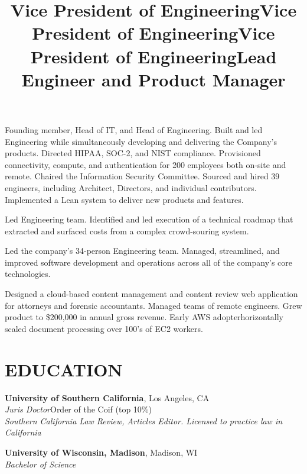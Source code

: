 \documentclass[margin]{res}
\begin{document}
\begin{resume}
\title{\textbf{Vice President of Engineering}}
\begin{position}
\hspace*{.5cm}Founding member, Head of IT, and Head of Engineering. Built and led Engineering while simultaneously developing and delivering the Company's products. Directed HIPAA, SOC-2, and NIST compliance. Provisioned connectivity, compute, and authentication for 200 employees both on-site and remote. Chaired the Information Security Committee. Sourced and hired 39 engineers, including Architect, Directors, and individual contributors. Implemented a Lean system to deliver new products and features.
\end{position}

\title{\textbf{Vice President of Engineering}}
\begin{position}
\hspace*{.5cm}Led Engineering team. Identified and led execution of a technical roadmap that extracted and surfaced costs from a complex crowd-souring system.
\end{position}

\title{\textbf{Vice President of Engineering}}
\begin{position}
\hspace*{.5cm}Led the company's 34-person Engineering team. Managed, streamlined, and improved software development and operations across all of the company's core technologies.
\end{position}

\title{\textbf{Lead Engineer and Product Manager}}
\begin{position}
\hspace*{.5cm}Designed a cloud-based content management and content review web application for attorneys and forensic accountants.  Managed teams of remote engineers. Grew product to \$200,000 in annual gross revenue. Early AWS adopter\textemdash horizontally scaled document processing over 100's of EC2 workers.
\end{position}


\section{EDUCATION}

\textbf{University of Southern California}, Los Angeles, CA\\
{\sl Juris Doctor}\hfill Order of the Coif
(top 10\%)
\\
{\sl Southern California Law Review, Articles Editor. Licensed to practice law in California}

\textbf{University of Wisconsin, Madison}, Madison, WI\\
{\sl Bachelor of Science}

\end{resume}
\end{document}

